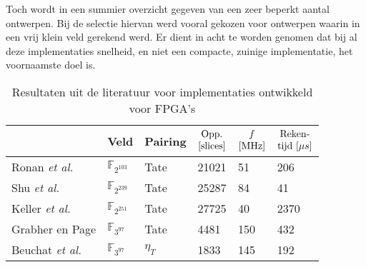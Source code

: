 Toch wordt in  een summier overzicht gegeven van een zeer beperkt aantal ontwerpen. Bij de selectie hiervan werd vooral gekozen voor ontwerpen waarin in een vrij klein veld gerekend werd. Er dient in acht te worden genomen dat bij al deze implementaties snelheid, en niet een compacte, zuinige implementatie, het voornaamste doel is. 

\begin{table}[h]
	\caption{Resultaten uit de literatuur voor implementaties ontwikkeld voor FPGA's}
	\label{tabel-resultaten-fpga}

	\centering
	\begin{tabular}{llllll}
		\toprule
		&	\multicolumn{1}{c}{Veld}	& \multicolumn{1}{c}{Pairing}	& $\begin{array}{@{}c@{}}\text{Opp.}\\\text{[slices]}\end{array}$	& $\begin{array}{@{}c@{}}f\\\text{[MHz]}\end{array}$	& $\begin{array}{@{}c@{}}\text{Reken-}\\\text{tijd }[\mu s]\end{array}$\\
		\midrule
		Ronan \emph{et al.} \cite{ronan}				& $\mathbb{F}_{2^{103}}$	& Tate		& 21021	& 51	& 206\\
		Shu \emph{et al.} \cite{shu}					& $\mathbb{F}_{2^{239}}$	& Tate		& 25287	& 84	& 41\\
		Keller \emph{et al.} \cite{keller}			& $\mathbb{F}_{2^{251}}$	& Tate		& 27725	& 40	& 2370\\
		Grabher en Page \cite{grabher}				& $\mathbb{F}_{3^{97}}$		& Tate		& 4481	& 150	& 432\\
		Beuchat \emph{et al.} \cite{beuchat-eta}	& $\mathbb{F}_{3^{97}}$		& $\eta_T$	& 1833	& 145	& 192\\
		\bottomrule
	\end{tabular}
\end{table}

